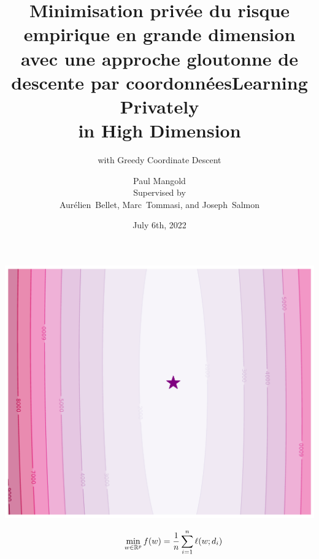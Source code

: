 \documentclass{beamer}
\title{Minimisation privée du risque empirique en grande dimension avec une approche gloutonne de descente par coordonnées}
\author{
  Paul Mangold \\[1em]
 Supervised by \\ Aurélien~Bellet, Marc~Tommasi, and Joseph~Salmon
}
\institute{\textsc{CAp 2022}}
\date{July 6th, 2022}
\begin{document}

\begin{notitle}
  \begin{frame}
    \titlepage
  \end{frame}
  \addtocounter{framenumber}{-1}
\end{notitle}



\title{\Huge Learning Privately \\ in High Dimension}
\subtitle{\LARGE with Greedy Coordinate Descent
\vspace{-1.17em}}
\begin{notitle}
  \begin{frame}
    \titlepage
  \end{frame}
  \addtocounter{framenumber}{-1}
\end{notitle}

\hspace{-3.3em}
\begin{frame}
  \vspace{-7.7em}
  \includegraphics[width=1.17\textwidth]{example_none.pdf}

  \vspace{-18em}
  \begin{align*}
    \qquad \qquad ~ \min_{w\in\mathbb R^p} f(w)
    & = \frac 1n \sum_{i=1}^n \ell(w; d_i)
  \end{align*}
\end{frame}
\end{document}
